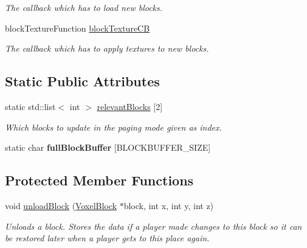 \begin{DoxyCompactItemize}
\begin{DoxyCompactList}\small\item\em \-The callback which has to load new blocks. \end{DoxyCompactList}\item 
\hypertarget{classVoxelVolume_a4a9247e812b572109a9789139573ae13}{
block\-Texture\-Function \hyperlink{classVoxelVolume_a4a9247e812b572109a9789139573ae13}{block\-Texture\-C\-B}}
\label{d0/d1c/classVoxelVolume_a4a9247e812b572109a9789139573ae13}

\begin{DoxyCompactList}\small\item\em \-The callback which has to apply textures to new blocks. \end{DoxyCompactList}\end{DoxyCompactItemize}
\subsection*{\-Static \-Public \-Attributes}
\begin{DoxyCompactItemize}
\item 
\hypertarget{classVoxelVolume_af60c721fb51fd505466b46b8e65258bf}{
static std\-::list$<$ int $>$ \hyperlink{classVoxelVolume_af60c721fb51fd505466b46b8e65258bf}{relevant\-Blocks} \mbox{[}2\mbox{]}}
\label{d0/d1c/classVoxelVolume_af60c721fb51fd505466b46b8e65258bf}

\begin{DoxyCompactList}\small\item\em \-Which blocks to update in the paging mode given as index. \end{DoxyCompactList}\item 
\hypertarget{classVoxelVolume_a6f1e03e046e24b7ee140e6f4ec7e838c}{
static char {\bfseries full\-Block\-Buffer} \mbox{[}\-B\-L\-O\-C\-K\-B\-U\-F\-F\-E\-R\-\_\-\-S\-I\-Z\-E\mbox{]}}
\label{d0/d1c/classVoxelVolume_a6f1e03e046e24b7ee140e6f4ec7e838c}

\end{DoxyCompactItemize}
\subsection*{\-Protected \-Member \-Functions}
\begin{DoxyCompactItemize}
\item 
\hypertarget{classVoxelVolume_acbb12beac7837810c73b433637fa3693}{
void \hyperlink{classVoxelVolume_acbb12beac7837810c73b433637fa3693}{unload\-Block} (\hyperlink{classVoxelBlock}{\-Voxel\-Block} $\ast$block, int x, int y, int z)}
\label{d0/d1c/classVoxelVolume_acbb12beac7837810c73b433637fa3693}

\begin{DoxyCompactList}\small\item\em \-Unloads a block. \-Stores the data if a player made changes to this block so it can be restored later when a player gets to this place again. \end{DoxyCompactList}\end{DoxyCompactItemize}



